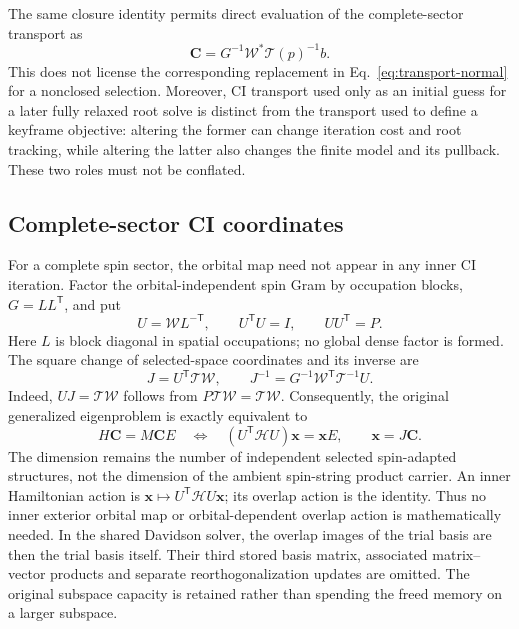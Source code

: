 \documentclass[11pt,a4paper]{article}
\newcommand{\Tr}{^{\mathsf T}}
\newcommand{\Wa}{\mathcal W}
\newcommand{\Ta}{\mathcal T}
\newcommand{\Ha}{\mathcal H}
\renewcommand{\vv}[1]{\mathbf{#1}}
\begin{document}
The same closure identity permits direct evaluation of the complete-sector
transport as
\begin{equation}
 \vv C=G^{-1}\Wa^*\Ta(p)^{-1}b.
\end{equation}
This does not license the
corresponding replacement in Eq.~\eqref{eq:transport-normal} for a nonclosed
selection. Moreover, CI transport used only as an initial guess for a later
fully relaxed root solve is distinct from the transport used to define a
keyframe objective: altering the former can change iteration cost and root
tracking, while altering the latter also changes the finite model and its
pullback. These two roles must not be conflated.

\subsection{Complete-sector CI coordinates}

For a complete spin sector, the orbital map need not appear in any inner
CI iteration. Factor the orbital-independent spin Gram by occupation blocks,
$G=LL\Tr$, and put
\begin{equation}
 U=\Wa L^{-\mathsf T},\qquad U\Tr U=I,\qquad UU\Tr=P.
\end{equation}
Here $L$ is block diagonal in spatial occupations; no global dense factor is
formed. The square change of selected-space coordinates and its inverse are
\begin{equation}\label{eq:full-ci-coordinates}
 J=U\Tr\Ta\Wa,\qquad
 J^{-1}=G^{-1}\Wa\Tr\Ta^{-1}U.
\end{equation}
Indeed, $UJ=\Ta\Wa$ follows from $P\Ta\Wa=\Ta\Wa$.
Consequently, the original generalized eigenproblem is exactly equivalent to
\begin{equation}
 H\vv C=M\vv C E\quad\Longleftrightarrow\quad
 (U\Tr\Ha U)\vv x=\vv x E,\qquad \vv x=J\vv C.
\end{equation}
The dimension remains the number of independent selected spin-adapted
structures, not the dimension of the ambient spin-string product carrier.
An inner Hamiltonian action is $\vv x\mapsto U\Tr\Ha U\vv x$;
its overlap action is the identity. Thus no inner exterior orbital map or
orbital-dependent overlap action is mathematically needed.
In the shared Davidson solver, the overlap images of the trial basis are
then the trial basis itself. Their third stored basis matrix, associated
matrix--vector products and separate reorthogonalization updates are omitted.
The original subspace capacity is retained rather than spending the freed
memory on a larger subspace.
\end{document}
